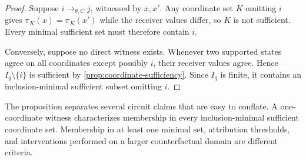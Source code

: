 \begin{proof}
Suppose $i\to_{\theta,C}j$, witnessed by $x,x'$. Any coordinate set $K$ omitting $i$ gives $\pi_K(x)=\pi_K(x')$ while the receiver values differ, so $K$ is not sufficient. Every minimal sufficient set must therefore contain $i$.

Conversely, suppose no direct witness exists. Whenever two supported states agree on all coordinates except possibly $i$, their receiver values agree. Hence $I_q\setminus\{i\}$ is sufficient by \cref{prop:coordinate-sufficiency}. Since $I_q$ is finite, it contains an inclusion-minimal sufficient subset omitting $i$.
\end{proof}

The proposition separates several circuit claims that are easy to conflate. A one-coordinate witness characterizes membership in every inclusion-minimal sufficient coordinate set. Membership in at least one minimal set, attribution thresholds, and interventions performed on a larger counterfactual domain are different criteria.
